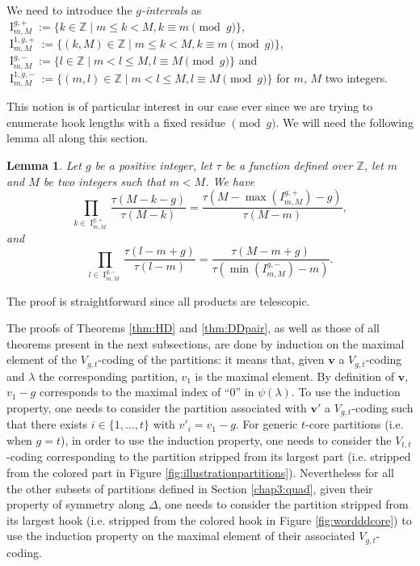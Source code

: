 \documentclass[11pt,letterpaper]{amsart}
\def\bbbz{\mathbb Z}
\newtheorem{lm}[df]{Lemma}
\DeclareMathOperator{\I}{I}
\numberwithin{equation}{section}
\numberwithin{df}{section}
\begin{document}
We need to introduce the \textit{$g$-intervals} as $\I_{m,M}^{g,+}:=\lbrace k\in \bbbz \mid m\leq k<M, k\equiv m \pmod g\rbrace$, $\I_{m,M}^{1,g,+}:=\lbrace (k,M)\in \bbbz \mid m\leq k<M, k\equiv m \pmod g\rbrace$, $\I_{m,M}^{g,-}:=\lbrace l\in \bbbz \mid m<l\leq M, l\equiv M \pmod g\rbrace$ and
$\I_{m,M}^{1,g,-}:=\lbrace (m,l)\in \bbbz \mid m<l\leq M, l\equiv M \pmod g\rbrace$ for $m$, $M$ two integers. 

This notion is of particular interest in our case ever since we are trying to enumerate hook lengths with a fixed residue $\pmod{g}$. We will need the following lemma all along this section.

\begin{lm}\label{lem:telescop}
Let $g$ be a positive integer, let $\tau$ be a function defined over $\bbbz$, let $m$ and $M$ be two integers such that $m<M$. We have
\begin{equation}\label{telescoplus}
\prod_{k\in \I_{m,M}^{g,+}}\frac{\tau(M-k-g)}{\tau(M-k)}=\frac{\tau(M-\max(I_{m,M}^{g,+})-g)}{\tau(M-m)},
\end{equation}
and
\begin{equation}\label{telescopmoins}
\prod_{l\in \I_{m,M}^{g,-}}\frac{\tau(l-m+g)}{\tau(l-m)}=\frac{\tau(M-m+g)}{\tau(\min(I_{m,M}^{g,-})-m)}.
\end{equation}
\end{lm}

The proof is straightforward since all products are telescopic.

The proofs of Theorems \ref{thm:HD} and \ref{thm:DDpair}, as well as those of all theorems present in the next subsections, are done by induction on the maximal element of the $V_{g,t}$-coding of the partitions: it means that, given $\mathbf{v}$ a $V_{g,t}$-coding and $\lambda$ the corresponding partition, $v_1$ is the maximal element. By definition of $\mathbf{v}$, $v_1-g$ corresponds to the maximal index of ``$0$'' in $\psi(\lambda)$. To use the induction property, one needs to consider the partition associated with $\mathbf{v}'$ a $V_{g,t}$-coding such that there exists $i\in\lbrace 1,\dots,t\rbrace$ with $v'_i=v_1-g$.
 For generic $t$-core partitions (i.e. when $g=t$), in order to use the induction property, one needs to consider the $V_{t,t}$-coding corresponding to the partition stripped from its largest part (i.e. stripped from the colored part in Figure \ref{fig:illustrationpartitions}). Nevertheless for all the other subsets of partitions defined in Section \ref{chap3:quad}, given their property of symmetry along $\Delta$,  one needs to consider the partition stripped from its largest hook (i.e. stripped from the colored hook in Figure \ref{fig:wordddcore}) to use the induction property on the maximal element of their associated $V_{g,t}$-coding.
 
\end{document}
